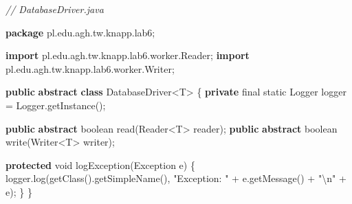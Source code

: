 \documentclass[11pt]{article}
\newenvironment{Shaded}{}{}
\newcommand{\KeywordTok}[1]{\textcolor[rgb]{0.00,0.44,0.13}{\textbf{{#1}}}}
\newcommand{\DataTypeTok}[1]{\textcolor[rgb]{0.56,0.13,0.00}{{#1}}}
\newcommand{\StringTok}[1]{\textcolor[rgb]{0.25,0.44,0.63}{{#1}}}
\newcommand{\CommentTok}[1]{\textcolor[rgb]{0.38,0.63,0.69}{\textit{{#1}}}}
\newcommand{\FunctionTok}[1]{\textcolor[rgb]{0.02,0.16,0.49}{{#1}}}
\newcommand{\NormalTok}[1]{{#1}}
\newcommand{\SpecialCharTok}[1]{\textcolor[rgb]{0.25,0.44,0.63}{{#1}}}
\newcommand{\ImportTok}[1]{{#1}}
\newcommand{\OperatorTok}[1]{\textcolor[rgb]{0.40,0.40,0.40}{{#1}}}
\newcommand{\BuiltInTok}[1]{{#1}}
\begin{document}
\begin{Shaded}
\begin{Highlighting}[]
\CommentTok{// DatabaseDriver.java}

\KeywordTok{package}\ImportTok{ pl}\OperatorTok{.}\ImportTok{edu}\OperatorTok{.}\ImportTok{agh}\OperatorTok{.}\ImportTok{tw}\OperatorTok{.}\ImportTok{knapp}\OperatorTok{.}\ImportTok{lab6}\OperatorTok{;}

\KeywordTok{import} \ImportTok{pl}\OperatorTok{.}\ImportTok{edu}\OperatorTok{.}\ImportTok{agh}\OperatorTok{.}\ImportTok{tw}\OperatorTok{.}\ImportTok{knapp}\OperatorTok{.}\ImportTok{lab6}\OperatorTok{.}\ImportTok{worker}\OperatorTok{.}\ImportTok{Reader}\OperatorTok{;}
\KeywordTok{import} \ImportTok{pl}\OperatorTok{.}\ImportTok{edu}\OperatorTok{.}\ImportTok{agh}\OperatorTok{.}\ImportTok{tw}\OperatorTok{.}\ImportTok{knapp}\OperatorTok{.}\ImportTok{lab6}\OperatorTok{.}\ImportTok{worker}\OperatorTok{.}\ImportTok{Writer}\OperatorTok{;}

\KeywordTok{public} \KeywordTok{abstract} \KeywordTok{class}\NormalTok{ DatabaseDriver}\OperatorTok{\textless{}}\NormalTok{T}\OperatorTok{\textgreater{}} \OperatorTok{\{}
    \KeywordTok{private} \DataTypeTok{final} \DataTypeTok{static} \BuiltInTok{Logger}\NormalTok{ logger }\OperatorTok{=} \BuiltInTok{Logger}\OperatorTok{.}\FunctionTok{getInstance}\OperatorTok{();}

    \KeywordTok{public} \KeywordTok{abstract} \DataTypeTok{boolean} \FunctionTok{read}\OperatorTok{(}\BuiltInTok{Reader}\OperatorTok{\textless{}}\NormalTok{T}\OperatorTok{\textgreater{}}\NormalTok{ reader}\OperatorTok{);}
    \KeywordTok{public} \KeywordTok{abstract} \DataTypeTok{boolean} \FunctionTok{write}\OperatorTok{(}\BuiltInTok{Writer}\OperatorTok{\textless{}}\NormalTok{T}\OperatorTok{\textgreater{}}\NormalTok{ writer}\OperatorTok{);}

    \KeywordTok{protected} \DataTypeTok{void} \FunctionTok{logException}\OperatorTok{(}\BuiltInTok{Exception}\NormalTok{ e}\OperatorTok{)} \OperatorTok{\{}
\NormalTok{        logger}\OperatorTok{.}\FunctionTok{log}\OperatorTok{(}\FunctionTok{getClass}\OperatorTok{().}\FunctionTok{getSimpleName}\OperatorTok{(),}
            \StringTok{"Exception: "} \OperatorTok{+}\NormalTok{ e}\OperatorTok{.}\FunctionTok{getMessage}\OperatorTok{()} \OperatorTok{+} \StringTok{"}\SpecialCharTok{\textbackslash{}n}\StringTok{"} \OperatorTok{+}\NormalTok{ e}\OperatorTok{);}
    \OperatorTok{\}}
\OperatorTok{\}}
\end{Highlighting}
\end{Shaded}
\end{document}

